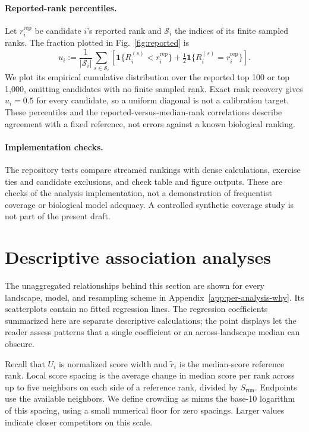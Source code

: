 \documentclass[11pt]{article}
\begin{document}
\paragraph{Reported-rank percentiles.}
Let $r_i^{\mathrm{rep}}$ be candidate $i$'s reported rank and $\mathcal S_i$
the indices of its finite sampled ranks. The fraction plotted in
Fig.~\ref{fig:reported} is
\[
u_i:=\frac{1}{|\mathcal S_i|}\sum_{s\in\mathcal S_i}
\left[\mathbf1\{R_i^{(s)}<r_i^{\mathrm{rep}}\}
+\tfrac12\mathbf1\{R_i^{(s)}=r_i^{\mathrm{rep}}\}\right].
\]
We plot its empirical cumulative distribution over the reported top 100
or top 1,000, omitting candidates with no finite sampled rank. Exact rank
recovery gives $u_i=0.5$ for every candidate, so a uniform diagonal is not
a calibration target. These percentiles and the reported-versus-median-rank
correlations describe agreement with a fixed reference, not errors against
a known biological ranking.

\paragraph{Implementation checks.}
The repository tests compare streamed rankings with dense calculations,
exercise ties and candidate exclusions, and check table and figure outputs.
These are checks of the analysis implementation, not a demonstration of
frequentist coverage or biological model adequacy. A controlled synthetic
coverage study is not part of the present draft.

\section{Descriptive association analyses}
\label{app:associations}

The unaggregated relationships behind this section are shown for every
landscape, model, and resampling scheme in
Appendix~\ref{app:per-analysis-why}. Its scatterplots contain no fitted
regression lines. The regression coefficients summarized here are separate
descriptive calculations; the point displays let the reader assess patterns
that a single coefficient or an across-landscape median can obscure.

Recall that $U_i$ is normalized score width and $\widetilde r_i$ is the
median-score reference rank. Local score spacing is the average change in
median score per rank across up to five neighbors on each side of a reference
rank, divided by $S_{\mathrm{run}}$. Endpoints use the available neighbors.
We define crowding as minus the base-10 logarithm of this spacing, using a
small numerical floor for zero spacings. Larger values indicate closer
competitors on this scale.
\end{document}
